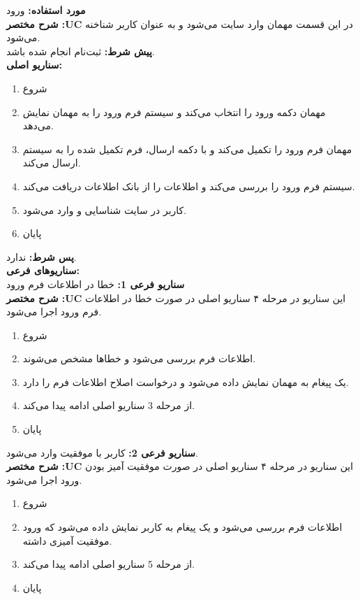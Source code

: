 \textbf{مورد استفاده:}
ورود
\\
\textbf{شرح مختصر :UC}
در این قسمت مهمان وارد سایت می‌شود و به عنوان کاربر شناخنه می‌شود.
\\
\textbf{پيش شرط:}
ثبت‌نام انجام شده باشد.
\\
\textbf{سناريو اصلی:}
\begin{enumerate}
\item
شروع
\item
مهمان دکمه ورود را انتخاب می‌کند و سیستم فرم ورود را به مهمان نمایش می‌دهد.
\item
مهمان فرم ورود را تکمیل می‌کند و با دکمه ارسال، فرم تکمیل شده را به سیستم ارسال می‌کند.
\item
سیستم فرم ورود را بررسی می‌کند و اطلاعات را از بانک اطلاعات دریافت می‌کند.
\item
کاربر در سایت شناسایی و وارد می‌شود.
\item
پایان
\end{enumerate}

\noindent
\textbf{پس شرط:}
ندارد.
\\
\textbf{سناريوهای فرعی:}
\\
\textbf{سناريو فرعی 1:}
خطا در اطلاعات فرم ورود
\\
\textbf{شرح مختصر :UC}
این سناریو در مرحله ۴ سناریو اصلی در صورت خطا در اطلاعات فرم ورود اجرا می‌شود.
\begin{enumerate}
\item
شروع
\item
اطلاعات فرم بررسی می‌شود و خطاها مشخص می‌شوند.
\item
یک پیغام به مهمان نمایش داده می‌شود و درخواست اصلاح اطلاعات فرم را دارد.
\item
از مرحله 3 سناریو اصلی ادامه پیدا می‌کند.
\item
پایان
\end{enumerate}

\noindent
\textbf{سناريو فرعی 2:}
کاربر با موفقیت وارد می‌شود.
\\
\textbf{شرح مختصر :UC}
این سناریو در مرحله ۴ سناریو اصلی در صورت موفقیت آمیز بودن ورود اجرا می‌شود.
\begin{enumerate}
\item
شروع
\item
اطلاعات فرم بررسی می‌شود و یک پیغام به کاربر نمایش داده می‌شود که ورود موفقیت آمیزی داشته.
\item
از مرحله 5 سناریو اصلی ادامه پیدا می‌کند.
\item
پایان
\end{enumerate}

